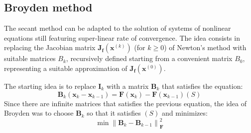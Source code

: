 \documentclass[12pt, a4paper]{report}
\begin{document}
    \subsection{Broyden method}
    The secant method can be adapted to the solution of systems of nonlinear equations still featuring super-linear rate of convergence. The idea consists in replacing the Jacobian 
    matrix $\boldsymbol{J}_{\boldsymbol{f}}(\boldsymbol{x}^{(k)})$ (for $k \geq 0$) of Newton's method with suitable matrices $B_k$, recursively defined starting from a convenient matrix $B_0$, 
    representing a suitable approximation of $\boldsymbol{J}_{\boldsymbol{f}}(\boldsymbol{x}^{(0)})$.
    
    The starting idea is to replace $\boldsymbol{I}_k$ with a matrix $\boldsymbol{B}_k$ that satisfies the equation: 
    \[\boldsymbol{B}_k\left(\boldsymbol{x}_k-\boldsymbol{x}_{k-1}\right)=\boldsymbol{F}(\boldsymbol{x}_k)-\boldsymbol{F}(\boldsymbol{x}_{k-1})(S)\]
    Since there are infinite matrices that satisfies the previous equation, the idea of Broyden was to choose $\boldsymbol{B}_k$ so that it satisfies $(S)$ and minimizes: 
    \[\min{\left\lVert \boldsymbol{B}_k-\boldsymbol{B}_{k-1} \right\rVert_{\boldsymbol{F}}^{2}}\]
\end{document}
